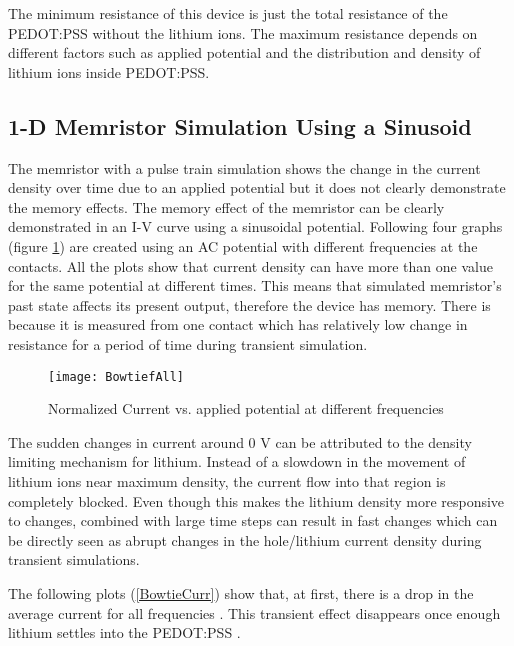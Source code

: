 \begin{doublespace}
The minimum resistance of this device is just the total resistance of the PEDOT:PSS without the lithium ions. The maximum resistance depends on different factors such as applied potential and the distribution and density of lithium ions inside  PEDOT:PSS.

\clearpage
\subsection{1-D Memristor Simulation Using a Sinusoid}

The memristor with a pulse train simulation shows the change in the current density over time due to an applied potential but it does not clearly demonstrate the memory effects. The memory effect of the memristor can be clearly demonstrated in an I-V curve using a sinusoidal potential. Following four graphs (figure \ref{Bowtie}) are created using an AC potential with different frequencies at the contacts. All the plots show that current density can have more than one value for the same potential at different times. This means that simulated memristor's past state affects its present output, therefore the device has  memory. There is  because it is measured from one contact which has relatively low change in resistance for a period of time during transient simulation. 

\begin{figure}[!htp]
\centering
\texttt{[image: BowtiefAll]}
\caption{Normalized Current vs. applied potential at different frequencies} 
\label{Bowtie}
\end{figure}

The sudden changes in current around 0 V can be attributed to the density limiting mechanism for lithium. Instead of a slowdown in the movement of lithium ions near maximum density, the current flow into that region is completely blocked. Even though this makes the lithium density more responsive to changes,  combined with large time steps can result in fast changes which can be directly seen as abrupt changes in the hole/lithium current density during transient simulations.  

The following plots (\ref{BowtieCurr}) show that, at first, there is a drop in the average current for all frequencies . This transient effect disappears once enough lithium settles into the PEDOT:PSS . 


\end{doublespace}

